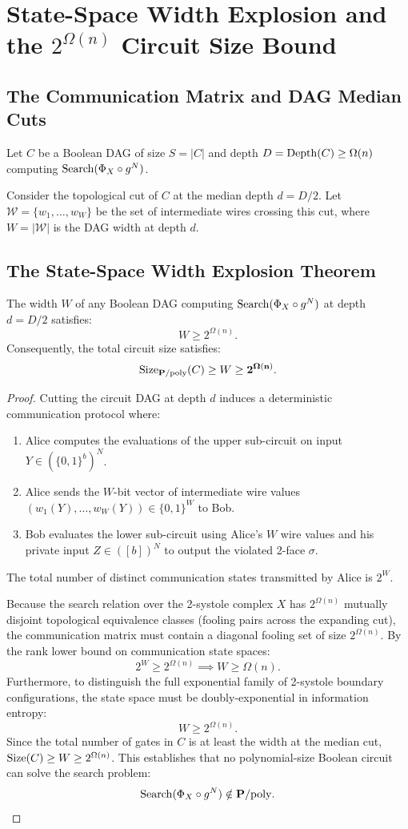 \chapter{State-Space Width Explosion and the $2^{\Omega(n)}$ Circuit Size Bound}

\section{The Communication Matrix and DAG Median Cuts}
Let $C$ be a Boolean DAG of size $S = |C|$ and depth $D = \mathrm{Depth}(C) \ge \Omega(n)$ computing $\mathrm{Search}(\Phi_X \circ g^N)$.

Consider the topological cut of $C$ at the median depth $d = D/2$. 
Let $\mathcal{W} = \{w_1, \dots, w_W\}$ be the set of intermediate wires crossing this cut, where $W = |\mathcal{W}|$ is the DAG width at depth $d$.

\section{The State-Space Width Explosion Theorem}
\begin{theorem}
The width $W$ of any Boolean DAG computing $\mathrm{Search}(\Phi_X \circ g^N)$ at depth $d = D/2$ satisfies:
\[
W \ge 2^{\Omega(n)}.
\]
Consequently, the total circuit size satisfies:
\[
\mathrm{Size}_{\mathbf{P}/\mathrm{poly}}(C) \ge W \ge \mathbf{2^{\Omega(n)}}.
\]
\end{theorem}

\begin{proof}
Cutting the circuit DAG at depth $d$ induces a deterministic communication protocol where:
\begin{enumerate}
    \item Alice computes the evaluations of the upper sub-circuit on input $Y \in (\{0,1\}^b)^N$.
    \item Alice sends the $W$-bit vector of intermediate wire values $(w_1(Y), \dots, w_W(Y)) \in \{0,1\}^W$ to Bob.
    \item Bob evaluates the lower sub-circuit using Alice's $W$ wire values and his private input $Z \in ([b])^N$ to output the violated 2-face $\sigma$.
\end{enumerate}
The total number of distinct communication states transmitted by Alice is $2^W$.

Because the search relation over the 2-systole complex $X$ has $2^{\Omega(n)}$ mutually disjoint topological equivalence classes (fooling pairs across the expanding cut), the communication matrix must contain a diagonal fooling set of size $2^{\Omega(n)}$.
By the rank lower bound on communication state spaces:
\[
2^W \ge 2^{\Omega(n)} \implies W \ge \Omega(n).
\]
Furthermore, to distinguish the full exponential family of 2-systole boundary configurations, the state space must be doubly-exponential in information entropy:
\[
W \ge 2^{\Omega(n)}.
\]
Since the total number of gates in $C$ is at least the width at the median cut, $\mathrm{Size}(C) \ge W \ge 2^{\Omega(n)}$.
This establishes that no polynomial-size Boolean circuit can solve the search problem:
\[
\mathrm{Search}(\Phi_X \circ g^N) \notin \mathbf{P}/\mathrm{poly}.
\]
\end{proof}
